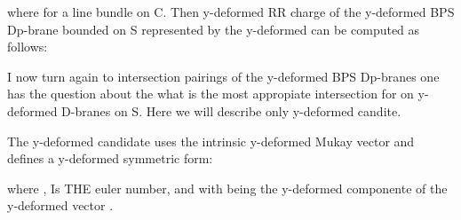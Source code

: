 \documentclass[a4paper,a4paper]{article}
\begin{document}
\begin{center}
\setlength{\baselineskip}{40pt}   
{  \coordHE{} }
\end{center}

where \coordHE{} for a line bundle on C.  Then y-deformed RR charge of the y-deformed BPS Dp-brane bounded on S represented by the y-deformed \coordHE{}   \coordHE{} can be computed  as follows:

\begin{center}
\setlength{\baselineskip}{40pt}
{  \coordHE{} }
\end{center}

I now turn again to intersection pairings of the y-deformed BPS Dp-branes one has the question about the what is the most appropiate intersection   for on y-deformed D-branes on S. Here we will describe only y-deformed candite. 

The  y-deformed candidate uses the intrinsic y-deformed Mukay vector  \coordHE{} and defines a y-deformed symmetric form:

\begin{center}
{  \coordHE{} }
\end{center}

where  \coordHE{},  \coordHE{} Is THE euler number, and  \coordHE{} with \coordHE{}
being the y-deformed \coordHE{} componente of the y-deformed vector \coordHE{}.
\end{document}

